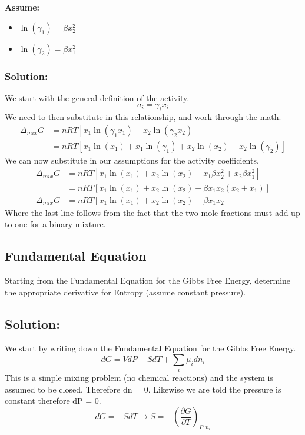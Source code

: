 \documentclass{article}
\newcommand{\be}{\begin{equation}}
\newcommand{\ee}{\end{equation}}
\newcommand{\pd}{\partial}
\begin{document}
\textbf{Assume:}
\begin{itemize}
\item $\ln(\gamma_1) = \beta x_2^2$
\item $\ln(\gamma_2) = \beta x_1^2$
\end{itemize}

\subsubsection*{Solution:}
We start with the general definition of the activity.
\be
a_i = \gamma_i x_i
\ee
We need to then substitute in this relationship, and work through the math.
\be
\begin{split}
\Delta_{mix}G &= nRT\left[x_1\ln(\gamma_1x_1) + x_2\ln(\gamma_2x_2)\right]\\
&= nRT\left[x_1\ln(x_1) + x_1\ln(\gamma_1) + x_2\ln(x_2) + x_2\ln(\gamma_2)\right]
\end{split}
\ee
We can now substitute in our assumptions for the activity coefficients.
\be
\begin{split}
\Delta_{mix}G &= nRT\left[x_1\ln(x_1) + x_2\ln(x_2) + x_1\beta x_2^2 + x_2\beta x_1^2\right]\\
&= nRT\left[x_1\ln(x_1) + x_2\ln(x_2) + \beta x_1x_2(x_2+x_1)\right] \\
\Delta_{mix}G &= nRT\left[x_1\ln(x_1) + x_2\ln(x_2) + \beta x_1x_2\right]
\end{split}
\ee
Where the last line follows from the fact that the two mole fractions must add up to one for a binary mixture. 

\subsection{Fundamental Equation}
Starting from the Fundamental Equation for the Gibbs Free Energy, determine the appropriate derivative for Entropy (assume constant pressure).

\subsection*{Solution:}
We start by writing down the Fundamental Equation for the Gibbs Free Energy.
\be
dG = VdP - SdT + \sum_i \mu_i dn_i 
\ee
This is a simple mixing problem (no chemical reactions) and the system is assumed to be closed.
Therefore dn = 0. 
Likewise we are told the pressure is constant therefore dP = 0. 
\be
dG = -SdT \rightarrow S = -\left(\frac{\pd G}{\pd T}\right)_{P,n_i}
\ee
\end{document}
